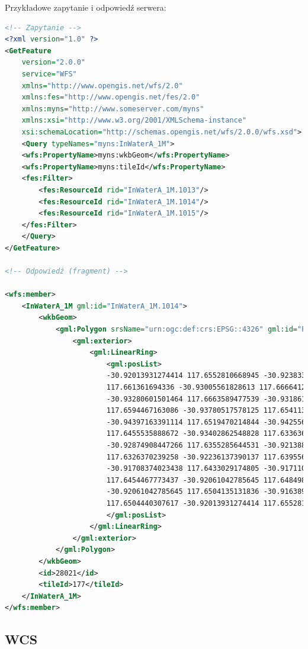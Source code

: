 Przykładowe zapytanie i odpowiedź serwera:
\begin{lstlisting}[frame=L, language=XML]
<!-- Zapytanie -->
<?xml version="1.0" ?>
<GetFeature
    version="2.0.0"
    service="WFS"
    xmlns="http://www.opengis.net/wfs/2.0"
    xmlns:fes="http://www.opengis.net/fes/2.0"
    xmlns:myns="http://www.someserver.com/myns"
    xmlns:xsi="http://www.w3.org/2001/XMLSchema-instance"
    xsi:schemaLocation="http://schemas.opengis.net/wfs/2.0.0/wfs.xsd">
    <Query typeNames="myns:InWaterA_1M">
    <wfs:PropertyName>myns:wkbGeom</wfs:PropertyName>
    <wfs:PropertyName>myns:tileId</wfs:PropertyName>
    <fes:Filter>
        <fes:ResourceId rid="InWaterA_1M.1013"/>
        <fes:ResourceId rid="InWaterA_1M.1014"/>
        <fes:ResourceId rid="InWaterA_1M.1015"/>
    </fes:Filter>
    </Query>
</GetFeature>

<!-- Odpowiedź (fragment) -->

<wfs:member>
    <InWaterA_1M gml:id="InWaterA_1M.1014">
        <wkbGeom>
            <gml:Polygon srsName="urn:ogc:def:crs:EPSG::4326" gml:id="P2">
                <gml:exterior>
                    <gml:LinearRing>
                        <gml:posList>
                        -30.92013931274414 117.6552810668945 -30.92383384704589
                        117.661361694336 -30.93005561828613 117.6666412353516
                        -30.93280601501464 117.6663589477539 -30.93186187744141
                        117.6594467163086 -30.93780517578125 117.6541137695312
                        -30.94397163391114 117.6519470214844 -30.94255638122559
                        117.6455535888672 -30.93402862548828 117.6336364746094
                        -30.92874908447266 117.6355285644531 -30.92138862609864
                        117.6326370239258 -30.92236137390137 117.6395568847656
                        -30.91708374023438 117.6433029174805 -30.91711044311523
                        117.6454467773437 -30.92061042785645 117.6484985351563
                        -30.92061042785645 117.6504135131836 -30.91638946533203
                        117.6504440307617 -30.92013931274414 117.6552810668945
                        </gml:posList>
                    </gml:LinearRing>
                </gml:exterior>
            </gml:Polygon>
        </wkbGeom>
        <id>28021</id>
        <tileId>177</tileId>
    </InWaterA_1M>
</wfs:member> 
\end{lstlisting}

\subsection{WCS}

